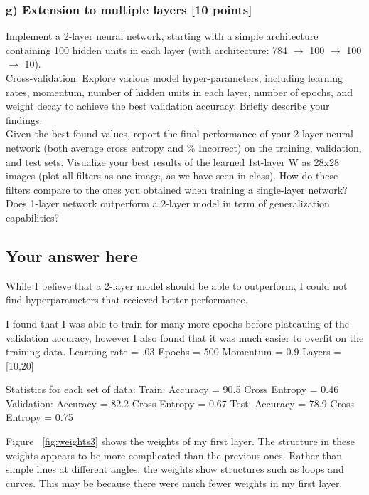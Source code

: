 \documentclass{article}
\begin{document}
\subsubsection*{g) Extension to multiple layers [10 points]}
Implement a 2-layer neural network, starting with a simple architecture 
containing 100 hidden units in each layer
(with architecture: 784 $\rightarrow$ 100 $\rightarrow$ 100 $\rightarrow$  10).
\\
  
Cross-validation: Explore various model hyper-parameters, including learning rates, 
momentum, number of hidden units in each layer, number of epochs, and weight decay 
to achieve the best validation accuracy. Briefly describe your findings.  
\\

Given the best found values, report the final performance of your 2-layer neural
network (both average cross entropy and \% Incorrect) on the training, validation, and test sets.
Visualize your best results of the learned 1st-layer W as 28x28 images 
(plot all filters as one image, as we have seen in class).
How do these filters compare to the ones you obtained when training a
single-layer network?
\\

Does 1-layer network outperform a 2-layer model in term of generalization capabilities?


\subsection*{Your answer here}

While I believe that a 2-layer model should be able to outperform, I could not find hyperparameters that recieved better performance.

I found that I was able to train for many more epochs before plateauing of the validation accuracy, however I also found that it was much easier to overfit on the training data.
Learning rate = .03
Epochs = 500
Momentum = 0.9
Layers = [10,20]


Statistics for each set of data:
Train:
Accuracy = 90.5
Cross Entropy = 0.46
Validation:
Accuracy = 82.2
Cross Entropy = 0.67
Test:
Accuracy = 78.9
Cross Entropy = 0.75

Figure ~\ref{fig:weights3} shows the weights of my first layer. The structure in these weights appears to be more complicated than the previous ones. Rather than simple lines at different angles, the weights show structures such as loops and curves. This may be because there were much fewer weights in my first layer.
\end{document}
